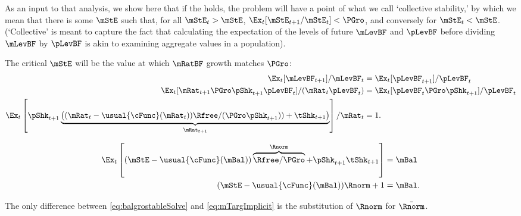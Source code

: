 \documentclass[BufferStockTheory]{subfiles}
\begin{document}
 As an input to that analysis, we show here that if the {\GIC} holds, the problem will have a point of what we call `collective stability,' by which we mean that there is some ${\mStE}$ such that, for all $\mStE_{t}>{\mStE}$, $\Ex_{t}[\mStE_{t+1}/\mStE_{t}] < \PGro$, and conversely for $\mStE_{t}<{\mStE}$.  (`Collective' is meant to capture the fact that calculating the expectation of the levels of future $\mLevBF$ and $\pLevBF$ before dividing $\mLevBF$ by $\pLevBF$ is akin to examining aggregate values in a population).

 \hypertarget{balgrostable}{}

 The critical $\mStE$ will be the value at which $\mRatBF$ growth matches $\PGro$:
  \begin{align}
  \Ex_{t}[\mLevBF_{t+1}]/\mLevBF_{t} & =\Ex_{t}[\pLevBF_{t+1}]/\pLevBF_{t} \notag
    \\  \Ex_{t}[\mRat_{t+1}\PGro\pShk_{t+1}\pLevBF_{t}]/(\mRat_{t}\pLevBF_{t}) & =\Ex_{t}[\pLevBF_{t}\PGro\pShk_{t+1}]/\pLevBF_{t} \notag
\\ \Ex_{t}\left[\pShk_{t+1}\underbrace{\left((\mRat_{t}-\usual{\cFunc}(\mRat_{t}))\Rfree/(\PGro\pShk_{t+1}))+\tShk_{t+1}\right)}_{\mRat_{t+1}}\right]/\mRat_{t} & = 1 \label{eq:balgrostable}.  
  \end{align}

\hypertarget{balgrostableSolve}{}


\begin{align}
  \Ex_{t}\left[(\mStE-\usual{\cFunc}(\mBal))\overbrace{\Rfree/\PGro}^{\Rnorm}+\pShk_{t+1}\tShk_{t+1}\right] & = \mBal \notag
\\  (\mStE-\usual{\cFunc}(\mBal))\Rnorm+ 1 & = \mBal \label{eq:balgrostableSolve}.  
\end{align}

The only difference between \eqref{eq:balgrostableSolve} and \eqref{eq:mTargImplicit} is the substitution of $\Rnorm$ for $\bar{\Rnorm}$.
\end{document}
